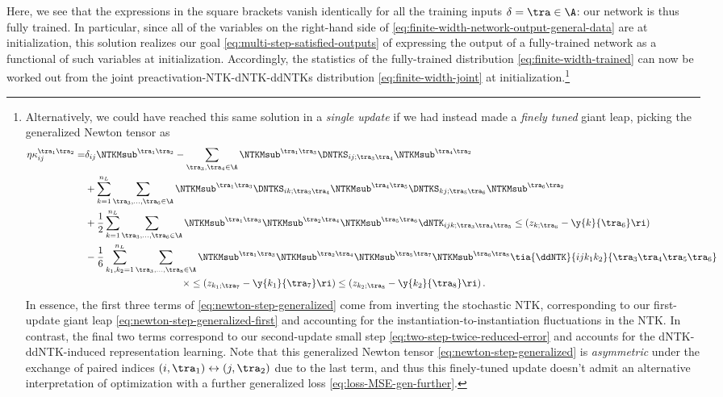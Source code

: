 Here, we see that the expressions in the square brackets vanish identically for all the training inputs $\delta=\tra\in\A$: our network is thus fully trained.
In particular, since all of the variables on the right-hand side of \eqref{eq:finite-width-network-output-general-data} are at initialization, this solution realizes our goal \eqref{eq:multi-step-satisfied-outputs} of expressing the output of a fully-trained network as a functional of such variables at initialization. Accordingly, the statistics of the fully-trained distribution \eqref{eq:finite-width-trained} can now be worked out from the joint preactivation-NTK-dNTK-ddNTKs distribution \eqref{eq:finite-width-joint} at initialization.\footnote{Alternatively, we could have reached this same solution in a \emph{single update} if we had instead made a  \emph{finely tuned} giant leap, picking the generalized Newton tensor as
\begin{align}\label{eq:newton-step-generalized}
\eta \kappa^{\tra_1\tra_2}_{ij} =& \delta_{ij} \NTKMsub^{\tra_1 \tra_2} -\sum_{\tra_3,\tra_4\in\A}\NTKMsub^{\tra_1\tra_3}\DNTKS_{ij;\tra_3\tra_4}\NTKMsub^{\tra_4\tra_2} \, \\
&+\sum_{k=1}^{n_L}\sum_{\tra_3,\ldots,\tra_6\in\A}\NTKMsub^{\tra_1\tra_3}\DNTKS_{ik;\tra_3\tra_4}\NTKMsub^{\tra_4\tra_5} \DNTKS_{kj;\tra_5\tra_6}\NTKMsub^{\tra_6\tra_2} \, \notag \\
&+\frac{1}{2}\sum_{k=1}^{n_L}\sum_{\tra_3,\ldots,\tra_6 \in \A} \NTKMsub^{\tra_1\tra_3}\NTKMsub^{\tra_2\tra_4}\NTKMsub^{\tra_5\tra_6}\dNTK_{i j k;\tra_3\tra_4\tra_5}\le(z_{k;\tra_6}-\y{k}{\tra_6} \ri)   \, \notag \\
&-\frac{1}{6}\sum_{k_1,k_2=1}^{n_L}\sum_{\tra_3,\ldots,\tra_8 \in \A} \NTKMsub^{\tra_1\tra_3}\NTKMsub^{\tra_2\tra_4}\NTKMsub^{\tra_5\tra_7}\NTKMsub^{\tra_6\tra_8}\tia{\ddNTK}{i j k_1k_2}{\tra_3\tra_4\tra_5\tra_6}  
  \, \notag \\
&\qquad\qquad\qquad\qquad\qquad\times\le(z_{k_1;\tra_7}-\y{k_1}{\tra_7}\ri)\le(z_{k_2;\tra_8}-\y{k_2}{\tra_8}\ri)
\notag \, .
\end{align}
In essence, the first three terms of \eqref{eq:newton-step-generalized}  come from inverting the stochastic NTK,
corresponding to our first-update giant leap \eqref{eq:newton-step-generalized-first} and 
accounting for the instantiation-to-instantiation fluctuations in the NTK. In contrast, the final two terms correspond to our second-update small step \eqref{eq:two-step-twice-reduced-error} and accounts for the dNTK-ddNTK-induced representation learning.
Note that this generalized Newton tensor \eqref{eq:newton-step-generalized} is \emph{asymmetric} under the exchange of paired indices $(i,\tra_1)\leftrightarrow(j,\tra_2)$ due to the last term, and thus this finely-tuned update doesn't admit an alternative interpretation of optimization with a further generalized loss \eqref{eq:loss-MSE-gen-further}.

}
